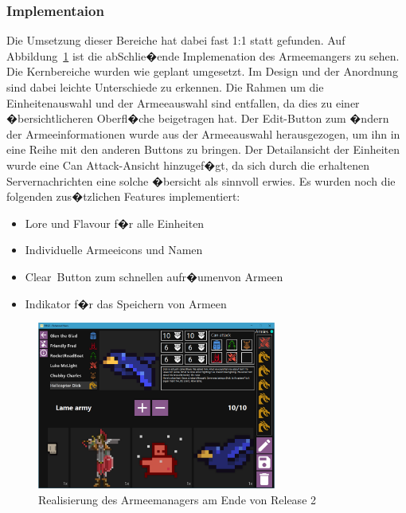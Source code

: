 \documentclass[12pt, titlepage]{scrartcl}
\newcommand{\Abb}[1]{%
	Abbildung\ \ref{#1}%
}
\begin{document}
			\subsubsection{Implementaion} Die Umsetzung dieser Bereiche hat dabei fast 1:1 statt gefunden. Auf \Abb{ImplementierungArmeemanager} ist die abSchlie�ende Implemenation des Armeemangers zu sehen. Die Kernbereiche wurden wie geplant umgesetzt. Im Design und der Anordnung sind dabei leichte Unterschiede zu erkennen. Die Rahmen um die Einheitenauswahl und der Armeeauswahl sind entfallen, da dies zu einer �bersichtlicheren Oberfl�che beigetragen hat. Der Edit-Button zum �ndern der Armeeinformationen wurde aus der Armeeauswahl herausgezogen, um ihn in eine Reihe mit den anderen Buttons zu bringen. Der Detailansicht der Einheiten wurde eine Can Attack-Ansicht hinzugef�gt, da sich durch die erhaltenen Servernachrichten eine solche �bersicht als sinnvoll erwies.
			Es wurden noch die folgenden zus�tzlichen Features implementiert:
			\begin{itemize}
				\item Lore und Flavour f�r alle Einheiten
				\item Individuelle Armeeicons und Namen
				\item Clear\ Button zum schnellen \glqq aufr�umen\grqq von Armeen
				\item Indikator f�r das Speichern von Armeen
			\end{itemize}
			
			\begin{figure}[H] 
				\centering
				\includegraphics[width=0.7\textwidth]{ArmyBuilder_final.PNG}
				\caption{Realisierung des Armeemanagers am Ende von Release 2}
				\label{ImplementierungArmeemanager}
			\end{figure}
		
\end{document}

